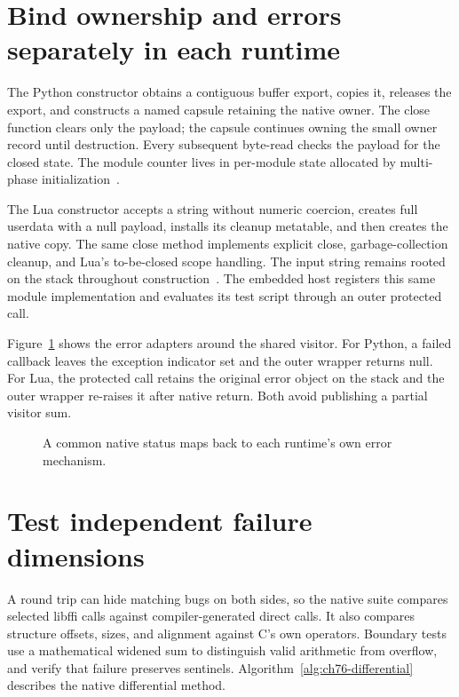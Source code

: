 \section{Bind ownership and errors separately in each runtime}
\label{sec:ch76-bindings}
The Python constructor obtains a contiguous buffer export, copies it, releases the export, and constructs a named capsule retaining the native owner.
The close function clears only the payload; the capsule continues owning the small owner record until destruction.
Every subsequent byte-read checks the payload for the closed state.
The module counter lives in per-module state allocated by multi-phase initialization~\cite{python-2026-capi}.

The Lua constructor accepts a string without numeric coercion, creates full userdata with a null payload, installs its cleanup metatable, and then creates the native copy.
The same close method implements explicit close, garbage-collection cleanup, and Lua's to-be-closed scope handling.
The input string remains rooted on the stack throughout construction~\cite{ierusalimschy-2026-lua}.
The embedded host registers this same module implementation and evaluates its test script through an outer protected call.

Figure~\ref{fig:ch76-errors} shows the error adapters around the shared visitor.
For Python, a failed callback leaves the exception indicator set and the outer wrapper returns null.
For Lua, the protected call retains the original error object on the stack and the outer wrapper re-raises it after native return.
Both avoid publishing a partial visitor sum.

\begin{figure}[htbp]
\centering
{}
\caption{A common native status maps back to each runtime's own error mechanism.}
\label{fig:ch76-errors}
\end{figure}

\section{Test independent failure dimensions}
\label{sec:ch76-tests}
A round trip can hide matching bugs on both sides, so the native suite compares selected libffi calls against compiler-generated direct calls.
It also compares structure offsets, sizes, and alignment against C's own operators.
Boundary tests use a mathematical widened sum to distinguish valid arithmetic from overflow, and verify that failure preserves sentinels.
Algorithm~\ref{alg:ch76-differential} describes the native differential method.

